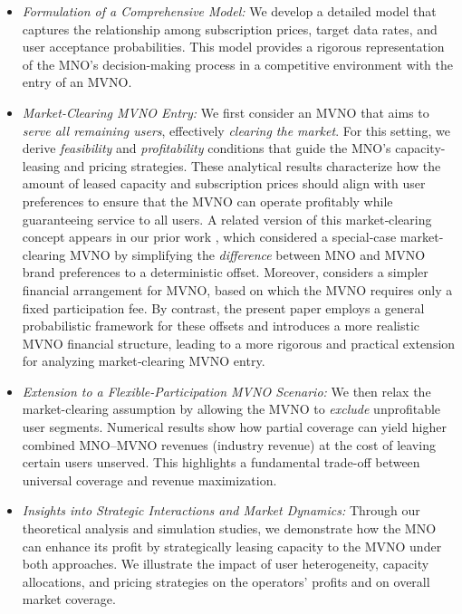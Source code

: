 \documentclass[12pt, draftclsnofoot, onecolumn]{IEEEtran}
\begin{document}
	\begin{itemize}
		\item \textit{Formulation of a Comprehensive Model:} 
		We develop a detailed model that captures the relationship among subscription prices, target data rates, and user acceptance probabilities. This model provides a rigorous representation of the MNO's decision-making process in a competitive environment with the entry of an MVNO.
		
		\item \textit{Market-Clearing MVNO Entry:}
		We first consider an MVNO that aims to \emph{serve all remaining users}, effectively \emph{clearing the market}. For this setting, we derive \emph{feasibility} and \emph{profitability} conditions that guide the MNO’s capacity-leasing and pricing strategies. These analytical results characterize how the amount of leased capacity and subscription prices should align with user preferences to ensure that the MVNO can operate profitably while guaranteeing service to all users.  
		A related version of this market‐clearing concept appears in our prior work \cite{Fazeli25}, which considered a special‐case market-clearing MVNO by simplifying the \emph{difference} between MNO and MVNO brand preferences to a deterministic offset. Moreover, \cite{Fazeli25} considers a simpler financial arrangement for MVNO, based on which the MVNO requires only a fixed participation fee. By contrast, the present paper employs a general probabilistic framework for these offsets and introduces a more realistic MVNO financial structure, leading to a more rigorous and practical extension for analyzing market‐clearing MVNO entry.
		
		\item \textit{Extension to a Flexible-Participation MVNO Scenario:}
		We then relax the market-clearing assumption by allowing the MVNO to \emph{exclude} unprofitable user segments. Numerical results show how partial coverage can yield higher combined MNO--MVNO revenues (industry revenue) at the cost of leaving certain users unserved. This highlights a fundamental trade-off between universal coverage and revenue maximization.
		
		\item \textit{Insights into Strategic Interactions and Market Dynamics:}
		Through our theoretical analysis and simulation studies, we demonstrate how the MNO can enhance its profit by strategically leasing capacity to the MVNO under both approaches. We illustrate the impact of user heterogeneity, capacity allocations, and pricing strategies on the operators’ profits and on overall market coverage. 
	\end{itemize}
	
\end{document}
